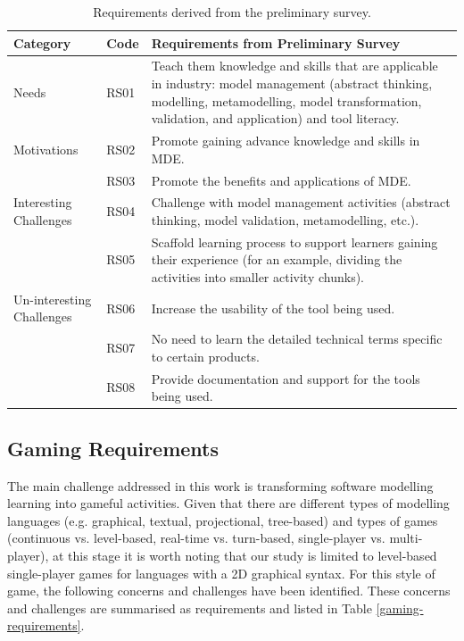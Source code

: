 \documentclass[12pt, a4paper]{report} \usepackage[titletoc]{appendix}
\begin{document}
\begin{table}[t!]
\caption{Requirements derived from the preliminary survey.}
\label{preliminary-survey}
\begin{center}
\begin{tabular}{ p{2cm}p{1cm}p{10cm} } 
\hline
Category & Code & Requirements from Preliminary Survey \\
\hline
\multirow{1}{2cm}{Needs} 
& RS01 & Teach them knowledge and skills that are applicable in industry: model management (abstract thinking, modelling, metamodelling, model transformation, validation, and application) and tool literacy. \\ 
\hline
\multirow{1}{2cm}{Motivations}
& RS02 & Promote gaining advance knowledge and skills in MDE. \\ 
& RS03 & Promote the benefits and applications of MDE. \\ 
\hline
\multirow{1}{2cm}{Interesting Challenges}
& RS04 & Challenge with model management activities (abstract thinking, model validation, metamodelling, etc.). \\ 
& RS05 & Scaffold learning process to support learners gaining their experience (for an example, dividing the activities into smaller activity chunks). \\ 
\hline
\multirow{1}{2cm}{Un-interesting Challenges}
& RS06 & Increase the usability of the tool being used. \\ 
& RS07 & No need to learn the detailed technical terms specific to certain products. \\ 
& RS08 & Provide documentation and support for the tools being used. \\ 
\hline
\end{tabular}
\end{center}
\end{table}


\subsection{Gaming Requirements}
\label{Gaming Requirements}
The main challenge addressed in this work is transforming software modelling learning into gameful activities. Given that there are different types of modelling languages (e.g. graphical, textual, projectional, tree-based) and types of games (continuous vs. level-based, real-time vs. turn-based, single-player vs. multi-player), at this stage it is worth noting that our study is limited to level-based single-player games for languages with a 2D graphical syntax. For this style of game, the following concerns and challenges have been identified. These concerns and challenges are summarised as requirements and listed in Table \ref{gaming-requirements}.
\end{document}
